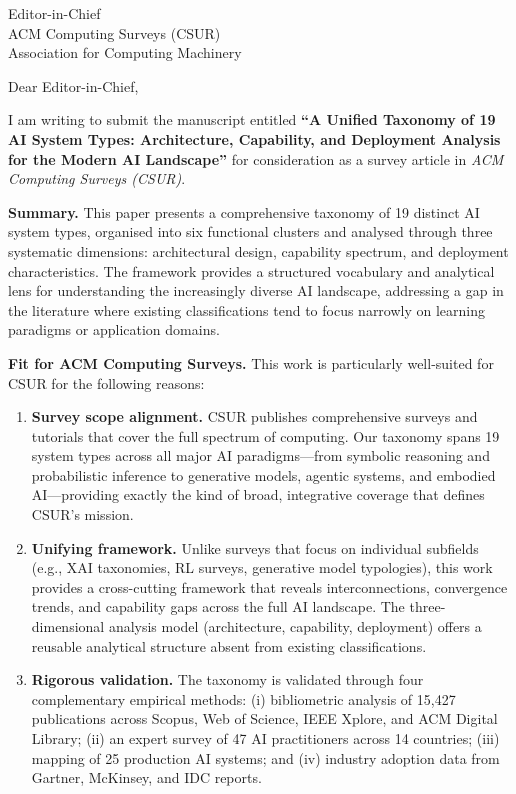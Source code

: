 \documentclass[11pt]{letter}
\begin{document}
\begin{letter}{%
  Editor-in-Chief\\
  ACM Computing Surveys (CSUR)\\
  Association for Computing Machinery}

\opening{Dear Editor-in-Chief,}

I am writing to submit the manuscript entitled \textbf{``A Unified Taxonomy of 19 AI System Types: Architecture, Capability, and Deployment Analysis for the Modern AI Landscape''} for consideration as a survey article in \textit{ACM Computing Surveys (CSUR)}.

\textbf{Summary.} This paper presents a comprehensive taxonomy of 19 distinct AI system types, organised into six functional clusters and analysed through three systematic dimensions: architectural design, capability spectrum, and deployment characteristics. The framework provides a structured vocabulary and analytical lens for understanding the increasingly diverse AI landscape, addressing a gap in the literature where existing classifications tend to focus narrowly on learning paradigms or application domains.

\textbf{Fit for ACM Computing Surveys.} This work is particularly well-suited for CSUR for the following reasons:

\begin{enumerate}
  \item \textbf{Survey scope alignment.} CSUR publishes comprehensive surveys and tutorials that cover the full spectrum of computing. Our taxonomy spans 19 system types across all major AI paradigms---from symbolic reasoning and probabilistic inference to generative models, agentic systems, and embodied AI---providing exactly the kind of broad, integrative coverage that defines CSUR's mission.

  \item \textbf{Unifying framework.} Unlike surveys that focus on individual subfields (e.g., XAI taxonomies, RL surveys, generative model typologies), this work provides a cross-cutting framework that reveals interconnections, convergence trends, and capability gaps across the full AI landscape. The three-dimensional analysis model (architecture, capability, deployment) offers a reusable analytical structure absent from existing classifications.

  \item \textbf{Rigorous validation.} The taxonomy is validated through four complementary empirical methods: (i) bibliometric analysis of 15,427 publications across Scopus, Web of Science, IEEE Xplore, and ACM Digital Library; (ii) an expert survey of 47 AI practitioners across 14 countries; (iii) mapping of 25 production AI systems; and (iv) industry adoption data from Gartner, McKinsey, and IDC reports.


\end{enumerate}
\end{letter}
\end{document}
